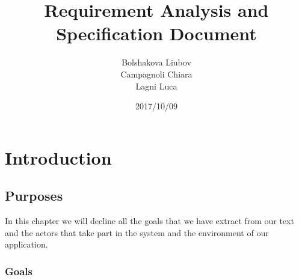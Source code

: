 \documentclass[a4paper]{book}
\begin{document}
\date{2017/10/09}
\author{Bolshakova Liubov\\ Campagnoli Chiara\\ Lagni Luca}
\title{Requirement Analysis and Specification Document}
\frontmatter                            %
\maketitle                              %
\tableofcontents                        %
\mainmatter   

\part{Introduction}

\chapter{Purposes}
In this chapter we will decline all the goals that we have extract from our text and the actors that take part in the system and the environment of our application.

\section{Goals}
\end{document}
